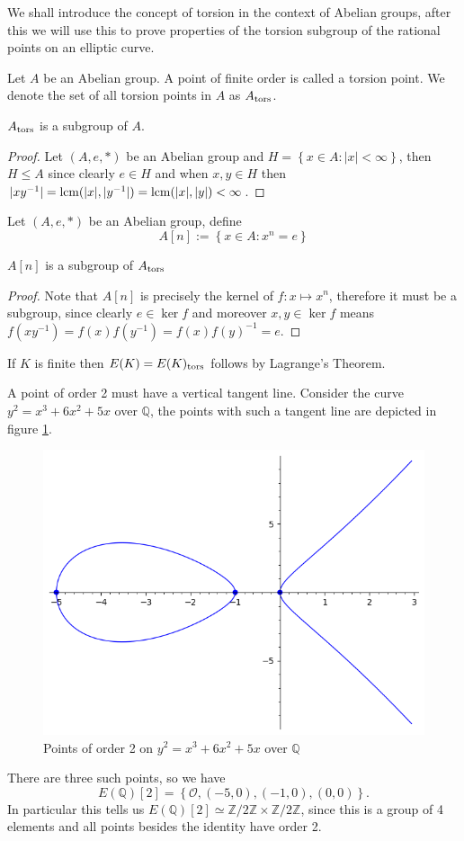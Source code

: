 We shall introduce the concept of torsion in the
context of Abelian groups, after this we will
use this to prove properties of the torsion subgroup
of the rational points on an elliptic curve.
\begin{definition}
  Let $A$ be an Abelian group. A point of finite order
  is called a torsion point. We denote the set of all
  torsion points in $A$ as $A_{\operatorname{tors}}$.
\end{definition}
\begin{theorem}
  $A_{\operatorname{tors}}$ is a subgroup of $A$.
\end{theorem}
\begin{proof}
  Let $(A, e, *)$ be an Abelian group and $H = \left\{ x \in A : |x| < \infty \right\}$,
  then $H \leq A$ since clearly $e \in H$ and when $x,y \in H$ then
  $|xy^{-1}| = \operatorname{lcm}(|x|, |y^{-1}|) = \operatorname{lcm}(|x|, |y|) < \infty$.
\end{proof}
\begin{definition}
  Let $(A, e, *)$ be an Abelian group, define
  \[ A[n] := \left\{ x \in A : x^n = e \right\}  \]
\end{definition}
\begin{theorem}
  $A[n]$ is a subgroup of $A_{\operatorname{tors}}$
\end{theorem}
\begin{proof}
  Note that $A[n]$ is precisely the kernel of $f: x \mapsto x^n$,
  therefore it must be a subgroup, since clearly $e \in \ker f$ and
  moreover $x, y \in \ker f$ means $f(xy^{-1}) = f(x) f(y^{-1}) = f(x) f(y)^{-1} = e$.
\end{proof}
\begin{example} \label{ex:torsionFinite}
  If $K$ is finite then $E(K) = E(K)_{\operatorname{tors}}$ follows by Lagrange's Theorem.
\end{example}
\begin{example} \label{ex:torsionInfinite}
  A point of order 2 must have a vertical tangent line.
  Consider the curve $y^2 = x^3 + 6x^2 + 5x$ over $\mathbb{Q}$,
  the points with such a tangent line are depicted in figure \ref{fig:pointsOfFiniteOrder/examplePointsOfOrder2}.
  \begin{figure}[H]
    \centering
    \includegraphics[width=0.3\linewidth]{pointsOfFiniteOrder/examplePointsOfOrder2.png}
    \caption{Points of order 2 on $y^2 = x^3+6x^2 + 5x$ over $\mathbb{Q}$ }%
    \label{fig:pointsOfFiniteOrder/examplePointsOfOrder2}
  \end{figure}
  \noindent
  There are three such points, so we have
  \[ E(\mathbb{Q})[2] = \left\{ \mathcal{O}, (-5 , 0), (-1 , 0 ), (0 , 0) \right\}. \]
  In particular this tells us $E(\mathbb{Q})[2] \simeq \mathbb{Z}/2\mathbb{Z} \times \mathbb{Z}/2\mathbb{Z}$,
  since this is a group of 4 elements and
  all points besides the identity have order 2.
\end{example}
